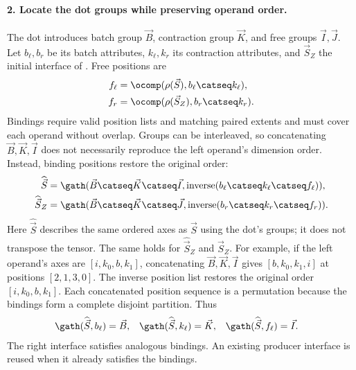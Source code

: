 \paragraph{2. Locate the dot groups while preserving operand order.}
The dot introduces batch group $\vec B$, contraction group $\vec K$, and free groups
$\vec I,\vec J$. Let $b_\ell,b_r$ be its batch attributes, $k_\ell,k_r$ its contraction
attributes, and $\vec S_Z$ the initial interface of . Free positions are
\begin{equation}
\begin{aligned}
 f_\ell&=\ocomp(\rho(\vec S),b_\ell\catseq k_\ell),\\
 f_r&=\ocomp(\rho(\vec S_Z),b_r\catseq k_r).
\end{aligned}
\end{equation}
Bindings require valid position lists and matching paired extents and must
cover each operand without overlap. Groups can be interleaved, so concatenating
$\vec B,\vec K,\vec I$ does not necessarily reproduce the left operand's dimension order.
Instead, binding positions restore the original order:
\begin{equation}
\begin{aligned}
 \widehat{\vec S}&=\gath(\vec B\catseq \vec K\catseq \vec I,
                  \operatorname{inverse}(b_\ell\catseq k_\ell\catseq f_\ell)),\\
 \widehat{\vec S}_Z&=\gath(\vec B\catseq \vec K\catseq \vec J,
                  \operatorname{inverse}(b_r\catseq k_r\catseq f_r)).
\end{aligned}
\label{extended:eq:rebuilt-interfaces}
\end{equation}
Here $\widehat{\vec S}$ describes the same ordered axes as $\vec S$ using the dot's
groups; it does not transpose the tensor. The same holds for
$\widehat{\vec S}_Z$ and $\vec S_Z$.
For example, if the left operand's axes are $[i,k_0,b,k_1]$, concatenating
$\vec B,\vec K,\vec I$ gives $[b,k_0,k_1,i]$ at positions $[2,1,3,0]$. The inverse
position list restores the original order $[i,k_0,b,k_1]$.
Each concatenated position sequence is a permutation because the bindings
form a complete disjoint partition. Thus
\begin{equation}
\begin{aligned}
 \gath(\widehat{\vec S},b_\ell)&=\vec B,&
 \gath(\widehat{\vec S},k_\ell)&=\vec K,&
 \gath(\widehat{\vec S},f_\ell)&=\vec I.
\end{aligned}
\end{equation}
The right interface satisfies analogous bindings. An existing producer
interface is reused when it already satisfies the bindings.

